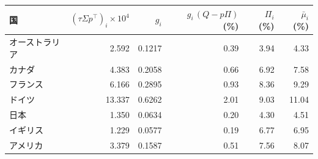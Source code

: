 \begin{tabular}{lrrrrr}
\toprule
国 & $(\tau\Sigma p^\top)_i \times 10^4$ & $g_i$ & $g_i\,(Q - p\Pi)$ (\%) & $\Pi_i$ (\%) & $\bar\mu_i$ (\%) \\
\midrule
オーストラリア & 2.592 & 0.1217 & 0.39 & 3.94 & 4.33 \\
カナダ & 4.383 & 0.2058 & 0.66 & 6.92 & 7.58 \\
フランス & 6.166 & 0.2895 & 0.93 & 8.36 & 9.29 \\
ドイツ & 13.337 & 0.6262 & 2.01 & 9.03 & 11.04 \\
日本 & 1.350 & 0.0634 & 0.20 & 4.30 & 4.51 \\
イギリス & 1.229 & 0.0577 & 0.19 & 6.77 & 6.95 \\
アメリカ & 3.379 & 0.1587 & 0.51 & 7.56 & 8.07 \\
\bottomrule
\end{tabular}

